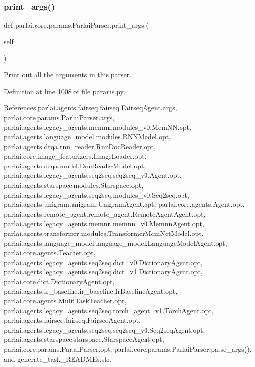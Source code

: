 \subsubsection{\texorpdfstring{print\+\_\+args()}{print\_args()}}
{\footnotesize\ttfamily def parlai.\+core.\+params.\+Parlai\+Parser.\+print\+\_\+args (\begin{DoxyParamCaption}\item[{}]{self }\end{DoxyParamCaption})}

\begin{DoxyVerb}Print out all the arguments in this parser.\end{DoxyVerb}
 

Definition at line 1008 of file params.\+py.



References parlai.\+agents.\+fairseq.\+fairseq.\+Fairseq\+Agent.\+args, parlai.\+core.\+params.\+Parlai\+Parser.\+args, parlai.\+agents.\+legacy\+\_\+agents.\+memnn.\+modules\+\_\+v0.\+Mem\+N\+N.\+opt, parlai.\+agents.\+language\+\_\+model.\+modules.\+R\+N\+N\+Model.\+opt, parlai.\+agents.\+drqa.\+rnn\+\_\+reader.\+Rnn\+Doc\+Reader.\+opt, parlai.\+core.\+image\+\_\+featurizers.\+Image\+Loader.\+opt, parlai.\+agents.\+drqa.\+model.\+Doc\+Reader\+Model.\+opt, parlai.\+agents.\+legacy\+\_\+agents.\+seq2seq.\+seq2seq\+\_\+v0.\+Agent.\+opt, parlai.\+agents.\+starspace.\+modules.\+Starspace.\+opt, parlai.\+agents.\+legacy\+\_\+agents.\+seq2seq.\+modules\+\_\+v0.\+Seq2seq.\+opt, parlai.\+agents.\+unigram.\+unigram.\+Unigram\+Agent.\+opt, parlai.\+core.\+agents.\+Agent.\+opt, parlai.\+agents.\+remote\+\_\+agent.\+remote\+\_\+agent.\+Remote\+Agent\+Agent.\+opt, parlai.\+agents.\+legacy\+\_\+agents.\+memnn.\+memnn\+\_\+v0.\+Memnn\+Agent.\+opt, parlai.\+agents.\+transformer.\+modules.\+Transformer\+Mem\+Net\+Model.\+opt, parlai.\+agents.\+language\+\_\+model.\+language\+\_\+model.\+Language\+Model\+Agent.\+opt, parlai.\+core.\+agents.\+Teacher.\+opt, parlai.\+agents.\+legacy\+\_\+agents.\+seq2seq.\+dict\+\_\+v0.\+Dictionary\+Agent.\+opt, parlai.\+agents.\+legacy\+\_\+agents.\+seq2seq.\+dict\+\_\+v1.\+Dictionary\+Agent.\+opt, parlai.\+core.\+dict.\+Dictionary\+Agent.\+opt, parlai.\+agents.\+ir\+\_\+baseline.\+ir\+\_\+baseline.\+Ir\+Baseline\+Agent.\+opt, parlai.\+core.\+agents.\+Multi\+Task\+Teacher.\+opt, parlai.\+agents.\+legacy\+\_\+agents.\+seq2seq.\+torch\+\_\+agent\+\_\+v1.\+Torch\+Agent.\+opt, parlai.\+agents.\+fairseq.\+fairseq.\+Fairseq\+Agent.\+opt, parlai.\+agents.\+legacy\+\_\+agents.\+seq2seq.\+seq2seq\+\_\+v0.\+Seq2seq\+Agent.\+opt, parlai.\+agents.\+starspace.\+starspace.\+Starspace\+Agent.\+opt, parlai.\+core.\+params.\+Parlai\+Parser.\+opt, parlai.\+core.\+params.\+Parlai\+Parser.\+parse\+\_\+args(), and generate\+\_\+task\+\_\+\+R\+E\+A\+D\+M\+Es.\+str.

